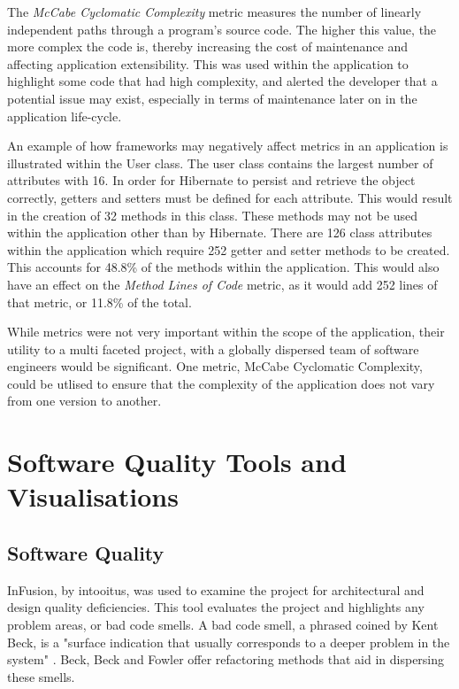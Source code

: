 The \textit{McCabe Cyclomatic Complexity} metric measures the number of linearly independent paths through a program's source code. The higher this value, the more complex the code is, thereby increasing the cost of maintenance and affecting application extensibility. This was used within the application to highlight some code that had high complexity, and alerted the developer that a potential issue may exist, especially in terms of maintenance later on in the application life-cycle.

An example of how frameworks may negatively affect metrics in an application is illustrated within the User class. The user class contains the largest number of attributes with 16. In order for Hibernate to persist and retrieve the object correctly, getters and setters must be defined for each attribute. This would result in the creation of 32 methods in this class. These methods may not be used within the application other than by Hibernate. There are 126 class attributes within the application which require 252 getter and setter methods to be created. This accounts for 48.8\% of the methods within the application. This would also have an effect on the \textit{Method Lines of Code} metric, as it would add 252 lines of that metric, or 11.8\% of the total. 

While metrics were not very important within the scope of the application, their utility to a multi faceted project, with a globally dispersed team of software engineers would be significant. One metric, McCabe Cyclomatic Complexity, could be utlised to ensure that the complexity of the application does not vary from one version to another. 

\section{Software Quality Tools and Visualisations}

\subsection{Software Quality}

InFusion, by intooitus, was used to examine the project for architectural and design quality deficiencies. This tool evaluates the project and highlights any problem areas, or bad code smells. A bad code smell, a phrased coined by Kent Beck, is a "surface indication that usually corresponds to a deeper problem in the system" \parencite{fowler}. Beck, Beck and Fowler offer refactoring methods that aid in dispersing these smells. 

